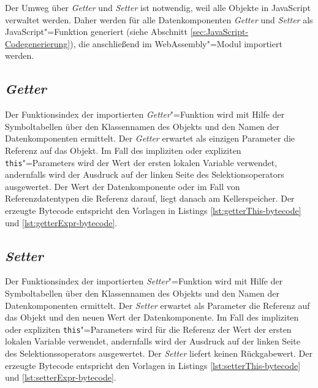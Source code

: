 Der Umweg über \emph{Getter} und \emph{Setter} ist notwendig, weil alle Objekte in JavaScript verwaltet werden. Daher werden für alle Datenkomponenten \emph{Getter} und \emph{Setter} als JavaScript"=Funktion generiert (siehe Abschnitt \ref{sec:JavaScript-Codegenerierung}), die anschließend im WebAssembly"=Modul importiert werden.

\subsection{\emph{Getter}}

Der Funktionsindex der importierten \emph{Getter}"=Funktion wird mit Hilfe der Symboltabellen über den Klassennamen des Objekts und den Namen der Datenkomponenten ermittelt. Der \emph{Getter} erwartet als einzigen Parameter die Referenz auf das Objekt. Im Fall des impliziten oder expliziten \lstinline{this}"=Parameters wird der Wert der ersten lokalen Variable verwendet, andernfalls wird der Ausdruck auf der linken Seite des Selektionsoperators ausgewertet. Der Wert der Datenkomponente oder im Fall von Referenzdatentypen die Referenz darauf, liegt danach am Kellerspeicher. Der erzeugte Bytecode entspricht den Vorlagen in Listings \ref{lst:getterThis-bytecode} und \ref{lst:getterExpr-bytecode}.





\subsection{\emph{Setter}}
\label{subsec:Zugriff-auf-Datenkomponenten-Setter}

Der Funktionsindex der importierten \emph{Setter}"=Funktion wird mit Hilfe der Symboltabellen über den Klassennamen des Objekts und den Namen der Datenkomponenten ermittelt. Der \emph{Setter} erwartet als Parameter die Referenz auf das Objekt und den neuen Wert der Datenkomponente. Im Fall des impliziten oder expliziten \lstinline{this}"=Parameters wird für die Referenz der Wert der ersten lokalen Variable verwendet, andernfalls wird der Ausdruck auf der linken Seite des Selektionssoperators ausgewertet. Der \emph{Setter} liefert keinen Rückgabewert. Der erzeugte Bytecode entspricht den Vorlagen in Listings \ref{lst:setterThis-bytecode} und \ref{lst:setterExpr-bytecode}.

